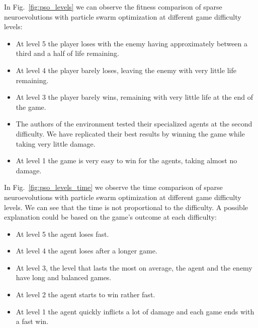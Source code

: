 \documentclass[conference]{IEEEtran}
\begin{document}
In Fig.~\ref{fig:pso_levels} we can observe the fitness comparison of sparse neuroevolutions with particle swarm
optimization at different game difficulty levels:
\begin{itemize}
    \item At level 5 the player loses with the enemy having approximately between a third and a half of life remaining.
    \item At level 4 the player barely loses, leaving the enemy with very little life remaining.
    \item At level 3 the player barely wins, remaining with very little life at the end of the game.
    \item The authors of the environment tested their specialized agents at the second difficulty.
    We have replicated their best results by winning the game while taking very little damage.
    \item At level 1 the game is very easy to win for the agents, taking almost no damage.
\end{itemize}

In Fig.~\ref{fig:pso_levels_time} we observe the time comparison of sparse neuroevolutions with particle swarm
optimization at different game difficulty levels.
We can see that the time is not proportional to the difficulty.
A possible explanation could be based on the game's outcome at each difficulty:
\begin{itemize}
    \item At level 5 the agent loses fast.
    \item At level 4 the agent loses after a longer game.
    \item At level 3, the level that lasts the most on average, the agent and the enemy have long and balanced games.
    \item At level 2 the agent starts to win rather fast.
    \item At level 1 the agent quickly inflicts a lot of damage and each game ends with a fast win.
\end{itemize}
\end{document}
